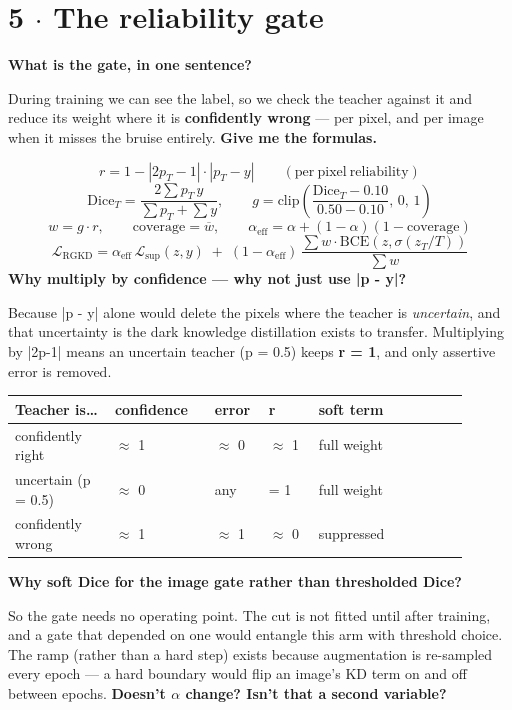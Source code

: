 \documentclass[10pt,a4paper]{article}
\newcommand{\qq}[1]{\medskip\noindent\textbf{\color{navy}#1}\par\nobreak}
\begin{document}
\section*{5 $\cdot$ The reliability gate}
\qq{What is the gate, in one sentence?}
During training we can see the label, so we check the teacher against it and reduce its weight where it is \textbf{confidently wrong} — per pixel, and per image when it misses the bruise entirely.
\qq{Give me the formulas.}
\[r = 1 - |2p_T - 1|\cdot|p_T - y| \qquad \mathrm{(per\ pixel\ reliability)}\]
\[\mathrm{Dice}_T = \frac{2\sum p_T\, y}{\sum p_T + \sum y}, \qquad g = \mathrm{clip}\!\left(\frac{\mathrm{Dice}_T - 0.10}{0.50 - 0.10},\,0,\,1\right)\]
\[w = g\cdot r, \qquad \mathrm{coverage} = \overline{w}, \qquad \alpha_{\mathrm{eff}} = \alpha + (1-\alpha)(1 - \mathrm{coverage})\]
\[\mathcal{L}_{\mathrm{RGKD}} = \alpha_{\mathrm{eff}}\,\mathcal{L}_{\mathrm{sup}}(z,y) \;+\; (1-\alpha_{\mathrm{eff}})\,\frac{\sum w \cdot \mathrm{BCE}\left(z, \sigma(z_T/T)\right)}{\sum w}\]
\qq{Why multiply by confidence — why not just use |p - y|?}
Because |p - y| alone would delete the pixels where the teacher is \textit{uncertain}, and that uncertainty is the dark knowledge distillation exists to transfer. Multiplying by |2p-1| means an uncertain teacher (p = 0.5) keeps \textbf{r = 1}, and only assertive error is removed.
\begin{center}\small\begin{tabular}{p{0.2\linewidth}p{0.2\linewidth}p{0.1\linewidth}p{0.1\linewidth}p{0.3\linewidth}}
\toprule
\textbf{Teacher is\dots} & \textbf{confidence} & \textbf{error} & \textbf{r} & \textbf{soft term} \\
\midrule
confidently right & $\approx$ 1 & $\approx$ 0 & $\approx$ 1 & full weight \\
uncertain (p = 0.5) & $\approx$ 0 & any & = 1 & full weight \\
confidently wrong & $\approx$ 1 & $\approx$ 1 & $\approx$ 0 & suppressed \\
\bottomrule\end{tabular}\end{center}
\qq{Why soft Dice for the image gate rather than thresholded Dice?}
So the gate needs no operating point. The cut is not fitted until after training, and a gate that depended on one would entangle this arm with threshold choice. The ramp (rather than a hard step) exists because augmentation is re-sampled every epoch — a hard boundary would flip an image's KD term on and off between epochs.
\qq{Doesn't $\alpha$ change? Isn't that a second variable?}
\end{document}
